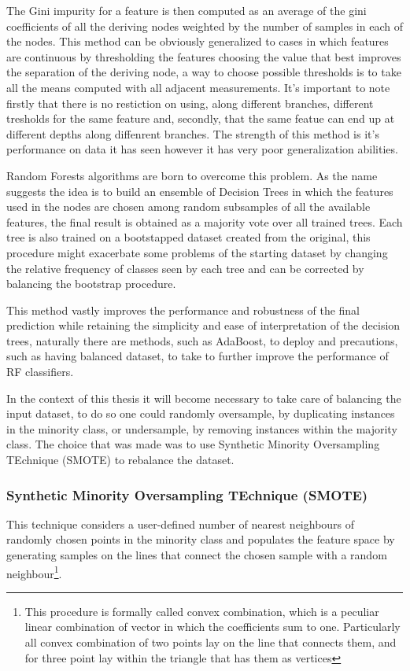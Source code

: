 The Gini impurity for a feature is then computed as an average of the gini coefficients of all the deriving nodes weighted by the number of samples in each of the nodes.  This method can be obviously generalized to cases in which features are continuous by thresholding the features choosing the value that best improves the separation of the deriving node, a way to choose possible thresholds is to take all the means computed with all adjacent measurements. It's important to note firstly that there is no restiction on using, along different branches, different tresholds for the same feature and, secondly, that the same featue can end up at different depths along diffenrent branches. The strength of this method is it's performance on data it has seen however it has very poor generalization abilities. 

Random Forests algorithms are born to overcome this problem. As the name suggests the idea is to build an ensemble of Decision Trees in which the features used in the nodes are chosen among random subsamples of all the available features, the final result is obtained as a majority vote over all trained trees. Each tree is also trained on a bootstapped dataset created from the original, this procedure might exacerbate some problems of the starting dataset by changing the relative frequency of classes seen by each tree and can be corrected by balancing the bootstrap procedure.

This method vastly improves the performance and robustness of the final prediction while retaining the simplicity and ease of interpretation of the decision trees, naturally there are methods, such as AdaBoost, to deploy and precautions, such as having balanced dataset, to take to further improve the performance of RF classifiers.

In the context of this thesis it will become necessary to take care of balancing the input dataset, to do so one could randomly oversample, by duplicating instances in the minority class, or undersample, by removing instances within the majority class. The choice that was made was to use Synthetic Minority Oversampling TEchnique (SMOTE)\cite{SMOTE} to rebalance the dataset.

\subsubsection{Synthetic Minority Oversampling TEchnique (SMOTE)}
This technique considers a user-defined number of nearest neighbours of randomly chosen points in the minority class and populates the feature space by generating samples on the lines that connect the chosen sample with a random neighbour\footnote{This procedure is formally called convex combination, which is a peculiar linear combination of vector in which the coefficients sum to one. Particularly all convex combination of two points lay on the line that connects them, and for three point lay within the triangle that has them as vertices}.


